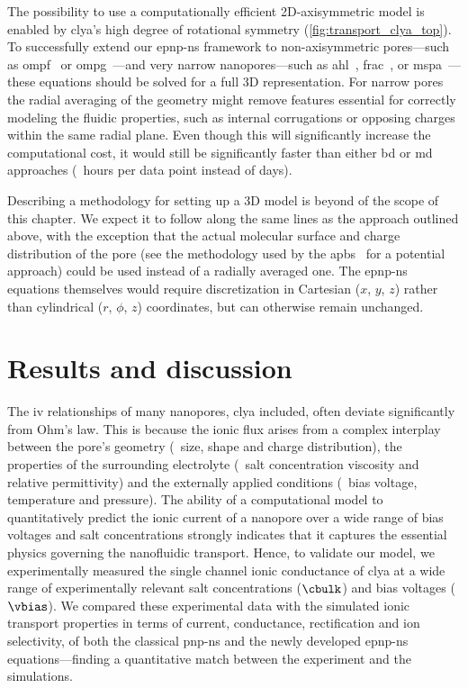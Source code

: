 The possibility to use a computationally efficient 2D-axisymmetric model is enabled by \gls{clya}'s high
degree of rotational symmetry (\cref{fig:transport_clya_top}). To successfully extend our \gls{epnp-ns}
framework to non-axisymmetric pores---such as \gls{ompf}~\cite{Yamashita-2008} or
\gls{ompg}~\cite{Subbarao-2006}---and very narrow nanopores---such as \gls{ahl}~\cite{Song-1996},
\gls{frac}~\cite{Tanaka-2015}, or \gls{mspa}~\cite{Faller-2004}---these equations should be solved for a full
3D representation. For narrow pores the radial averaging of the geometry might remove features essential for
correctly modeling the fluidic properties, such as internal corrugations or opposing charges within the same
radial plane. Even though this will significantly increase the computational cost, it would still be
significantly faster than either \gls{bd} or \gls{md} approaches (\ie~hours per data point instead of days).

Describing a methodology for setting up a 3D model is beyond of the scope of this chapter. We expect it to
follow along the same lines as the approach outlined above, with the exception that the actual molecular
surface and charge distribution of the pore (see the methodology used by the
\gls{apbs}~\cite{Baker-2001,Jurrus-2018} for a potential approach) could be used instead of a radially
averaged one. The \gls{epnp-ns} equations themselves would require discretization in Cartesian ($x$, $y$, $z$)
rather than cylindrical ($r$, $\phi$, $z$) coordinates, but can otherwise remain unchanged.


\section{Results and discussion}
%
\label{sec:transport:results}
%

The \gls{iv} relationships of many nanopores, \gls{clya} included, often deviate significantly from Ohm's law.
This is because the ionic flux arises from a complex interplay between the pore's geometry (\eg~size, shape
and charge distribution), the properties of the surrounding electrolyte (\eg~salt concentration viscosity and
relative permittivity) and the externally applied conditions (\eg~bias voltage, temperature and pressure). The
ability of a computational model to quantitatively predict the ionic current of a nanopore over a wide range
of bias voltages and salt concentrations strongly indicates that it captures the essential physics governing
the nanofluidic transport. Hence, to validate our model, we experimentally measured the single channel ionic
conductance of \gls{clya} at a wide range of experimentally relevant salt concentrations ($\cbulk$) and bias
voltages ($\vbias$). We compared these experimental data with the simulated ionic transport properties in
terms of current, conductance, rectification and ion selectivity, of both the classical \gls{pnp-ns} and the
newly developed \gls{epnp-ns} equations---finding a quantitative match between the experiment and the
simulations.

